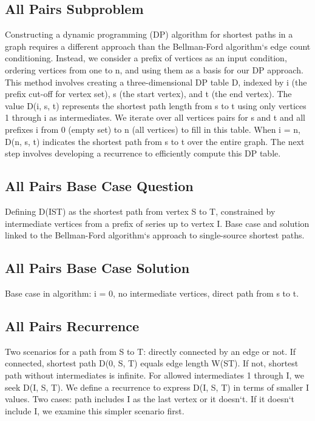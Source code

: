 \subsection*{All Pairs  Subproblem}
Constructing a dynamic programming (DP) algorithm for shortest paths in a graph requires a different approach than the Bellman-Ford algorithm`s edge count conditioning.
Instead, we consider a prefix of vertices as an input condition, ordering vertices from one to n, and using them as a basis for our DP approach.
This method involves creating a three-dimensional DP table D, indexed by i (the prefix cut-off for vertex set), s (the start vertex), and t (the end vertex).
The value D(i, s, t) represents the shortest path length from s to t using only vertices 1 through i as intermediates.
We iterate over all vertices pairs for s and t and all prefixes i from 0 (empty set) to n (all vertices) to fill in this table.
When i = n, D(n, s, t) indicates the shortest path from s to t over the entire graph.
The next step involves developing a recurrence to efficiently compute this DP table.

\subsection*{All Pairs  Base Case Question}
Defining D(IST) as the shortest path from vertex S to T, constrained by intermediate vertices from a prefix of series up to vertex I\@.
Base case and solution linked to the Bellman-Ford algorithm`s approach to single-source shortest paths.

\subsection*{All Pairs  Base Case Solution}
Base case in algorithm: i = 0, no intermediate vertices, direct path from s to t.

\subsection*{All Pairs  Recurrence}
Two scenarios for a path from S to T: directly connected by an edge or not.
If connected, shortest path D(0, S, T) equals edge length W(ST).
If not, shortest path without intermediates is infinite.
For allowed intermediates 1 through I, we seek D(I, S, T).
We define a recurrence to express D(I, S, T) in terms of smaller I values.
Two cases: path includes I as the last vertex or it doesn`t.
If it doesn`t include I, we examine this simpler scenario first.

